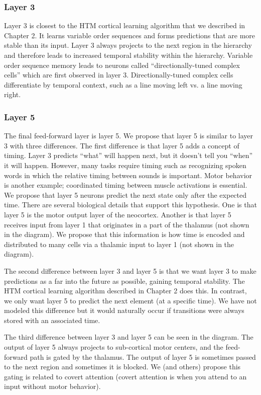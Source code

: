 \documentclass{report}
\begin{document}
\subsubsection*{Layer 3}
Layer 3 is closest to the HTM cortical learning algorithm that we
described in Chapter 2. It learns variable order sequences and forms
predictions that are more stable than its input. Layer 3 always
projects to the next region in the hierarchy and therefore leads to
increased temporal stability within the hierarchy. Variable order
sequence memory leads to neurons called ``directionally-tuned complex
cells'' which are first observed in layer 3. Directionally-tuned
complex cells differentiate by temporal context, such as a line moving
left vs. a line moving right.

\subsubsection*{Layer 5}
The final feed-forward layer is layer 5. We propose that layer 5 is
similar to layer 3 with three differences. The first difference is
that layer 5 adds a concept of timing. Layer 3 predicts ``what'' will
happen next, but it doesn't tell you ``when'' it will happen. However,
many tasks require timing such as recognizing spoken words in which
the relative timing between sounds is important. Motor behavior is
another example; coordinated timing between muscle activations is
essential. We propose that layer 5 neurons predict the next state only
after the expected time. There are several biological details that
support this hypothesis. One is that layer 5 is the motor output layer
of the neocortex. Another is that layer 5 receives input from layer 1
that originates in a part of the thalamus (not shown in the
diagram). We propose that this information is how time is encoded and
distributed to many cells via a thalamic input to layer 1 (not shown
in the diagram).

The second difference between layer 3 and layer 5 is that we want
layer 3 to make predictions as a far into the future as possible,
gaining temporal stability. The HTM cortical learning algorithm
described in Chapter 2 does this. In contrast, we only want layer 5 to
predict the next element (at a specific time). We have not modeled
this difference but it would naturally occur if transitions were
always stored with an associated time.

The third difference between layer 3 and layer 5 can be seen in the
diagram. The output of layer 5 always projects to sub-cortical motor
centers, and the feed-forward path is gated by the thalamus. The
output of layer 5 is sometimes passed to the next region and sometimes
it is blocked. We (and others) propose this gating is related to
covert attention (covert attention is when you attend to an input
without motor behavior).
\end{document}
